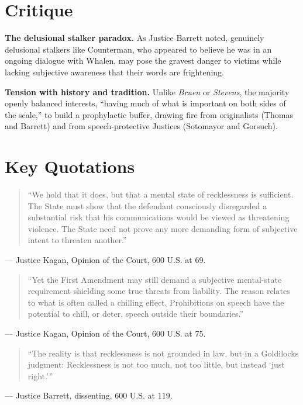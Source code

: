 \documentclass[12pt]{article}
\begin{document}
\section{Critique}

\textbf{The delusional stalker paradox.} As Justice Barrett noted, genuinely delusional stalkers like Counterman, who appeared to believe he was in an ongoing dialogue with Whalen, may pose the gravest danger to victims while lacking subjective awareness that their words are frightening.

\textbf{Tension with history and tradition.} Unlike \textit{Bruen} or \textit{Stevens}, the majority openly balanced interests, ``having much of what is important on both sides of the scale,'' to build a prophylactic buffer, drawing fire from originalists (Thomas and Barrett) and from speech-protective Justices (Sotomayor and Gorsuch).

\section{Key Quotations}

\begin{quote}
``We hold that it does, but that a mental state of recklessness is sufficient. The State must show that the defendant consciously disregarded a substantial risk that his communications would be viewed as threatening violence. The State need not prove any more demanding form of subjective intent to threaten another.''
\end{quote}
\noindent --- Justice Kagan, Opinion of the Court, 600 U.S. at 69.

\begin{quote}
``Yet the First Amendment may still demand a subjective mental-state requirement shielding some true threats from liability. The reason relates to what is often called a chilling effect. Prohibitions on speech have the potential to chill, or deter, speech outside their boundaries.''
\end{quote}
\noindent --- Justice Kagan, Opinion of the Court, 600 U.S. at 75.

\begin{quote}
``The reality is that recklessness is not grounded in law, but in a Goldilocks judgment: Recklessness is not too much, not too little, but instead `just right.'\thinspace''
\end{quote}
\noindent --- Justice Barrett, dissenting, 600 U.S. at 119.
\end{document}
